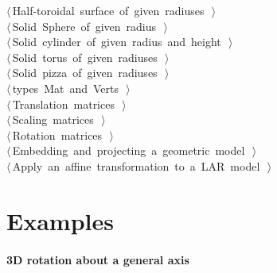 \documentclass[11pt,oneside]{article}	%
\begin{document}
\begin{flushleft}
\begin{list}{}{}
\mbox{}\verb@@\hbox{$\langle\,$Half-toroidal surface of given radiuses\nobreak\ {\footnotesize {}}$\,\rangle$}\verb@@\\
\mbox{}\verb@@\hbox{$\langle\,$Solid Sphere of given radius\nobreak\ {\footnotesize {}}$\,\rangle$}\verb@@\\
\mbox{}\verb@@\hbox{$\langle\,$Solid cylinder of given radius and height\nobreak\ {\footnotesize {}}$\,\rangle$}\verb@@\\
\mbox{}\verb@@\hbox{$\langle\,$Solid torus of given radiuses\nobreak\ {\footnotesize {}}$\,\rangle$}\verb@@\\
\mbox{}\verb@@\hbox{$\langle\,$Solid pizza of given radiuses\nobreak\ {\footnotesize {}}$\,\rangle$}\verb@@\\
\mbox{}\verb@@\hbox{$\langle\,$types Mat and Verts\nobreak\ {\footnotesize {}}$\,\rangle$}\verb@@\\
\mbox{}\verb@@\hbox{$\langle\,$Translation matrices\nobreak\ {\footnotesize {}}$\,\rangle$}\verb@@\\
\mbox{}\verb@@\hbox{$\langle\,$Scaling matrices\nobreak\ {\footnotesize {}}$\,\rangle$}\verb@@\\
\mbox{}\verb@@\hbox{$\langle\,$Rotation matrices\nobreak\ {\footnotesize {}}$\,\rangle$}\verb@@\\
\mbox{}\verb@@\hbox{$\langle\,$Embedding and projecting a geometric model\nobreak\ {\footnotesize {}}$\,\rangle$}\verb@@\\
\mbox{}\verb@@\hbox{$\langle\,$Apply an affine transformation to a LAR model\nobreak\ {\footnotesize {}}$\,\rangle$}\verb@@\\
\mbox{}\verb@@{\NWsep}
\end{list}
\vspace{-2ex}
\end{flushleft}
\section{Examples}

\paragraph{3D rotation about a general axis}
\end{document}
